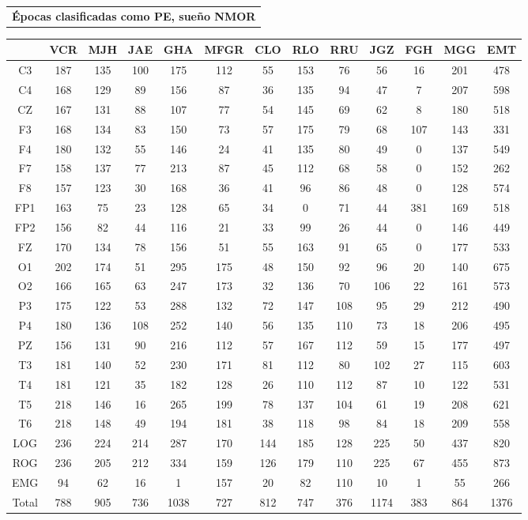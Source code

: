 \documentclass[12pt,a4paper]{mitthesis}
\begin{document}

\begin{SidewaysFigure}
\centering
\begin{tabular}{c}
\textbf{\'Epocas clasificadas como PE, sue\~no NMOR}
\vspace{1em}
\end{tabular}
\begin{tabular}{c|ccccc|cccc|ccc}
& VCR & MJH & JAE & GHA & MFGR
& CLO & RLO & RRU & JGZ
& FGH & MGG & EMT \\
\hline
C3&187&135&100&175&112&55&153&76&56&16&201&478 \\
C4&168&129&89&156&87&36&135&94&47&7&207&598 \\
CZ&167&131&88&107&77&54&145&69&62&8&180&518 \\
F3&168&134&83&150&73&57&175&79&68&107&143&331 \\
F4&180&132&55&146&24&41&135&80&49&0&137&549 \\
F7&158&137&77&213&87&45&112&68&58&0&152&262 \\
F8&157&123&30&168&36&41&96&86&48&0&128&574 \\
FP1&163&75&23&128&65&34&0&71&44&381&169&518 \\
FP2&156&82&44&116&21&33&99&26&44&0&146&449 \\
FZ&170&134&78&156&51&55&163&91&65&0&177&533 \\
O1&202&174&51&295&175&48&150&92&96&20&140&675 \\
O2&166&165&63&247&173&32&136&70&106&22&161&573 \\
P3&175&122&53&288&132&72&147&108&95&29&212&490 \\
P4&180&136&108&252&140&56&135&110&73&18&206&495 \\
PZ&156&131&90&216&112&57&167&112&59&15&177&497 \\
T3&181&140&52&230&171&81&112&80&102&27&115&603 \\
T4&181&121&35&182&128&26&110&112&87&10&122&531 \\
T5&218&146&16&265&199&78&137&104&61&19&208&621 \\
T6&218&148&49&194&181&38&118&98&84&18&209&558 \\
LOG&236&224&214&287&170&144&185&128&225&50&437&820 \\
ROG&236&205&212&334&159&126&179&110&225&67&455&873 \\
EMG&94&62&16&1&157&20&82&110&10&1&55&266 \\
\hline
Total&788&905&736&1038&727&812&747&376&1174&383&864&1376
\end{tabular}
\caption{Total  de \'epocas PE dentro del registro pero que no fueron clasificadas como MOR (fases 
W y N) para cada canal. En la \'ultima fila se reporta el n\'umero total de \'epocas clasificadas 
como sue\~no NMOR para cada sujeto (en todos los canales se registr\'o la misma cantidad de 
\'epocas).
}
\label{total_gpos_nmor}
\end{SidewaysFigure}
\end{document}
